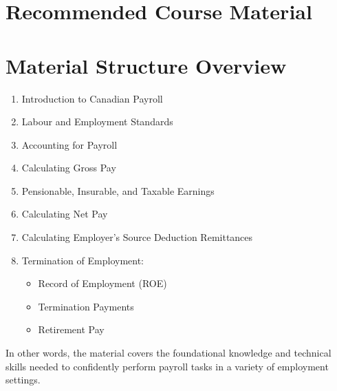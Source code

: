 \documentclass[letterpaper,10pt,english]{sphinxmanual}
\begin{document}
\section{Recommended Course Material}
\label{\detokenize{preface:recommended-course-material}}

\section{Material Structure Overview}
\label{\detokenize{preface:material-structure-overview}}\begin{enumerate}
%
\item {} 
\sphinxAtStartPar
Introduction to Canadian Payroll

\item {} 
\sphinxAtStartPar
Labour and Employment Standards

\item {} 
\sphinxAtStartPar
Accounting for Payroll

\item {} 
\sphinxAtStartPar
Calculating Gross Pay

\item {} 
\sphinxAtStartPar
Pensionable, Insurable, and Taxable Earnings

\item {} 
\sphinxAtStartPar
Calculating Net Pay

\item {} 
\sphinxAtStartPar
Calculating Employer’s Source Deduction Remittances

\item {} 
\sphinxAtStartPar
Termination of Employment:
\begin{itemize}
\item {} 
\sphinxAtStartPar
Record of Employment (ROE)

\item {} 
\sphinxAtStartPar
Termination Payments

\item {} 
\sphinxAtStartPar
Retirement Pay

\end{itemize}

\end{enumerate}

\sphinxAtStartPar
In other words, the material covers the foundational knowledge and technical skills needed to confidently perform payroll tasks in a variety of employment settings.
\end{document}

